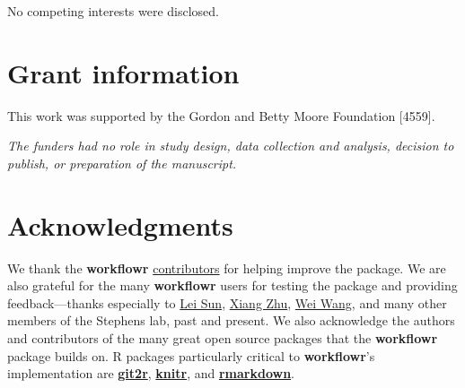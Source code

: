 \documentclass[9pt,a4paper]{extarticle}
\begin{document}
No competing interests were disclosed.


\section*{Grant information}

This work was supported by the Gordon and Betty Moore Foundation [4559].

\textit{The funders had no role in study design, data collection and
analysis, decision to publish, or preparation of the manuscript.}


\section*{Acknowledgments}

We thank the \textbf{workflowr}
\href{https://github.com/jdblischak/workflowr/graphs/contributors}{contributors}
for helping improve the package. We are also grateful for the many
 \textbf{workflowr} users for testing the package and providing feedback---thanks
especially to \href{https://github.com/LSun}{Lei Sun},
\href{https://github.com/xiangzhu}{Xiang Zhu},
\href{https://github.com/NKweiwang}{Wei Wang}, and many other members of
the Stephens lab, past and present. We also acknowledge the authors and
contributors of the many great open source packages that the \textbf{workflowr}
package builds on. R packages particularly critical to \textbf{workflowr}'s
implementation are
\textbf{\href{https://cran.r-project.org/web/packages/git2r/index.html}{git2r}},
\textbf{\href{https://github.com/yihui/knitr}{knitr}}, and
\textbf{\href{http://rmarkdown.rstudio.com/}{rmarkdown}}.

{\small

}
\end{document}
